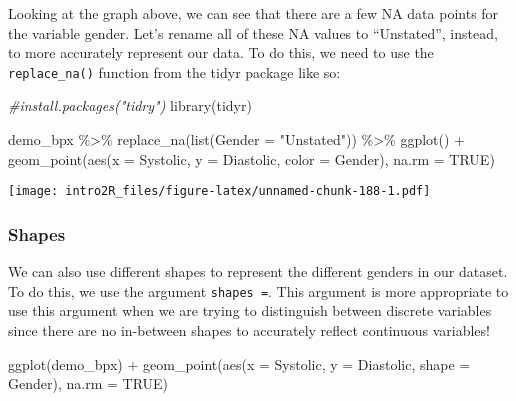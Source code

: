\documentclass[
]{book}
\newenvironment{Shaded}{\begin{snugshade}}{\end{snugshade}}
\newcommand{\AttributeTok}[1]{\textcolor[rgb]{0.77,0.63,0.00}{#1}}
\newcommand{\CommentTok}[1]{\textcolor[rgb]{0.56,0.35,0.01}{\textit{#1}}}
\newcommand{\ConstantTok}[1]{\textcolor[rgb]{0.00,0.00,0.00}{#1}}
\newcommand{\FunctionTok}[1]{\textcolor[rgb]{0.00,0.00,0.00}{#1}}
\newcommand{\NormalTok}[1]{#1}
\newcommand{\SpecialCharTok}[1]{\textcolor[rgb]{0.00,0.00,0.00}{#1}}
\newcommand{\StringTok}[1]{\textcolor[rgb]{0.31,0.60,0.02}{#1}}
\begin{document}
Looking at the graph above, we can see that there are a few NA data points for the variable gender. Let's rename all of these NA values to ``Unstated'', instead, to more accurately represent our data. To do this, we need to use the \texttt{replace\_na()} function from the tidyr package like so:

\begin{Shaded}
\begin{Highlighting}[]
\CommentTok{\#install.packages("tidry")}
\FunctionTok{library}\NormalTok{(tidyr)}
\end{Highlighting}
\end{Shaded}

\begin{Shaded}
\begin{Highlighting}[]
\NormalTok{demo\_bpx }\SpecialCharTok{\%\textgreater{}\%} 
    \FunctionTok{replace\_na}\NormalTok{(}\FunctionTok{list}\NormalTok{(}\AttributeTok{Gender =} \StringTok{"Unstated"}\NormalTok{)) }\SpecialCharTok{\%\textgreater{}\%}
    \FunctionTok{ggplot}\NormalTok{() }\SpecialCharTok{+} 
        \FunctionTok{geom\_point}\NormalTok{(}\FunctionTok{aes}\NormalTok{(}\AttributeTok{x =}\NormalTok{ Systolic, }
                       \AttributeTok{y =}\NormalTok{ Diastolic, }
                       \AttributeTok{color =}\NormalTok{ Gender), }
                   \AttributeTok{na.rm =} \ConstantTok{TRUE}\NormalTok{)}
\end{Highlighting}
\end{Shaded}

\texttt{[image: intro2R\_files/figure-latex/unnamed-chunk-188-1.pdf]}

\hypertarget{shapes}{%
\subsubsection{Shapes}\label{shapes}}

We can also use different shapes to represent the different genders in our dataset. To do this, we use the argument \texttt{shapes\ =}. This argument is more appropriate to use this argument when we are trying to distinguish between discrete variables since there are no in-between shapes to accurately reflect continuous variables!

\begin{Shaded}
\begin{Highlighting}[]
\FunctionTok{ggplot}\NormalTok{(demo\_bpx) }\SpecialCharTok{+}
  \FunctionTok{geom\_point}\NormalTok{(}\FunctionTok{aes}\NormalTok{(}\AttributeTok{x =}\NormalTok{ Systolic,}
                 \AttributeTok{y =}\NormalTok{ Diastolic,}
                 \AttributeTok{shape =}\NormalTok{ Gender), }
             \AttributeTok{na.rm =} \ConstantTok{TRUE}\NormalTok{)}
\end{Highlighting}
\end{Shaded}
\end{document}
